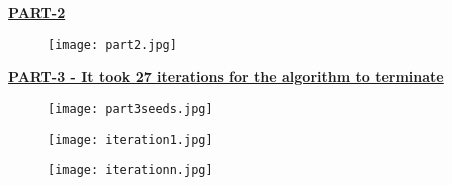 \documentclass{report}
\begin{document}
\begin{flushleft}
\break
\underline { \textbf{PART-2}}  \linebreak[2]

\begin{figure}[tph!]
\centering
\texttt{[image: part2.jpg]}
\end{figure}

\break
\underline { \textbf{PART-3 - It took 27 iterations for the algorithm to terminate}}\linebreak[2]

\begin{figure}[tph!]
\centering
\texttt{[image: part3seeds.jpg]}
\end{figure}

\begin{figure}[tph!]
\centering
\texttt{[image: iteration1.jpg]}
\end{figure}

\begin{figure}[tph!]
\centering
\texttt{[image: iterationn.jpg]}
\end{figure}

\end{flushleft} 
\end{document}
